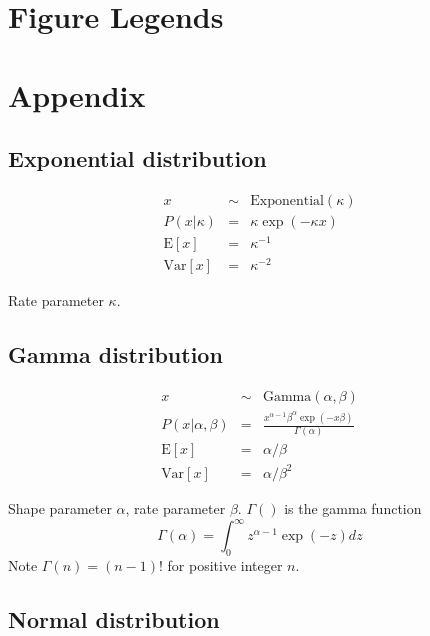 \documentclass[10pt]{article}
\begin{document}


\clearpage
\section{Figure Legends}

\clearpage
\section{Appendix}

\subsection{Exponential distribution}

\begin{eqnarray*}
x & \sim & \mbox{Exponential}(\kappa) \\
P(x|\kappa) & = & \kappa \exp(-\kappa x) \\
\mbox{E}[x] & = & \kappa^{-1} \\
\mbox{Var}[x] & = & \kappa^{-2}
\end{eqnarray*}

Rate parameter $\kappa$.


\subsection{Gamma distribution}

\begin{eqnarray*}
x & \sim & \mbox{Gamma}(\alpha,\beta) \\
P(x|\alpha,\beta) & = & \frac{x^{\alpha-1} \beta^\alpha \exp(-x \beta)}{\Gamma(\alpha)} \\
\mbox{E}[x] & = & \alpha/\beta \\
\mbox{Var}[x] & = & \alpha/\beta^2
\end{eqnarray*}

Shape parameter $\alpha$, rate parameter $\beta$.
$\Gamma()$ is the gamma function
\[
\Gamma(\alpha) = \int_0^{\infty} z^{\alpha-1} \exp(-z) dz
\]
Note $\Gamma(n) = (n-1)!$ for positive integer $n$.

\subsection{Normal distribution}
\end{document}
